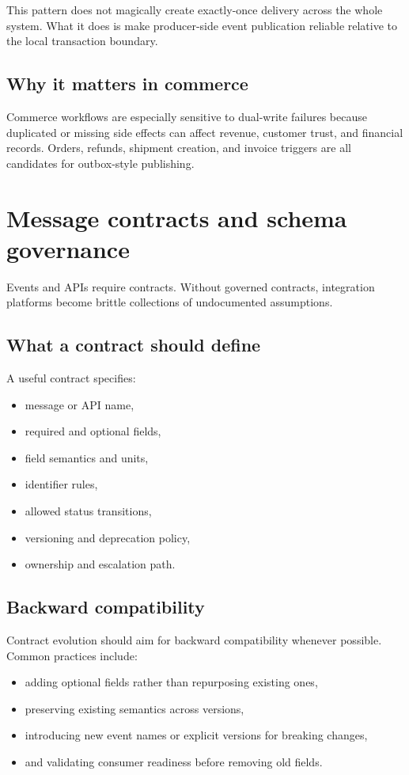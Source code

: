 This pattern does not magically create exactly-once delivery across the whole system.
What it does is make producer-side event publication reliable relative to the local transaction boundary.

\subsection{Why it matters in commerce}
Commerce workflows are especially sensitive to dual-write failures because duplicated or missing side effects can affect revenue, customer trust, and financial records.
Orders, refunds, shipment creation, and invoice triggers are all candidates for outbox-style publishing.

\section{Message contracts and schema governance}
Events and APIs require contracts.
Without governed contracts, integration platforms become brittle collections of undocumented assumptions.

\subsection{What a contract should define}
A useful contract specifies:
\begin{itemize}
  \item message or API name,
  \item required and optional fields,
  \item field semantics and units,
  \item identifier rules,
  \item allowed status transitions,
  \item versioning and deprecation policy,
  \item ownership and escalation path.
\end{itemize}

\subsection{Backward compatibility}
Contract evolution should aim for backward compatibility whenever possible.
Common practices include:
\begin{itemize}
  \item adding optional fields rather than repurposing existing ones,
  \item preserving existing semantics across versions,
  \item introducing new event names or explicit versions for breaking changes,
  \item and validating consumer readiness before removing old fields.
\end{itemize}

